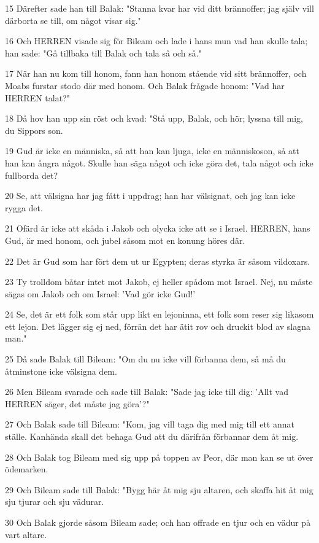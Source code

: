 \par 15 Därefter sade han till Balak: "Stanna kvar har vid ditt brännoffer; jag själv vill därborta se till, om något visar sig."
\par 16 Och HERREN visade sig för Bileam och lade i hans mun vad han skulle tala; han sade: "Gå tillbaka till Balak och tala så och så."
\par 17 När han nu kom till honom, fann han honom stående vid sitt brännoffer, och Moabs furstar stodo där med honom. Och Balak frågade honom: "Vad har HERREN talat?"
\par 18 Då hov han upp sin röst och kvad: "Stå upp, Balak, och hör; lyssna till mig, du Sippors son.
\par 19 Gud är icke en människa, så att han kan ljuga, icke en människoson, så att han kan ångra något. Skulle han säga något och icke göra det, tala något och icke fullborda det?
\par 20 Se, att välsigna har jag fått i uppdrag; han har välsignat, och jag kan icke rygga det.
\par 21 Ofärd är icke att skåda i Jakob och olycka icke att se i Israel. HERREN, hans Gud, är med honom, och jubel såsom mot en konung höres där.
\par 22 Det är Gud som har fört dem ut ur Egypten; deras styrka är såsom vildoxars.
\par 23 Ty trolldom båtar intet mot Jakob, ej heller spådom mot Israel. Nej, nu måste sägas om Jakob och om Israel: 'Vad gör icke Gud!'
\par 24 Se, det är ett folk som står upp likt en lejoninna, ett folk som reser sig likasom ett lejon. Det lägger sig ej ned, förrän det har ätit rov och druckit blod av slagna man."
\par 25 Då sade Balak till Bileam: "Om du nu icke vill förbanna dem, så må du åtminstone icke välsigna dem.
\par 26 Men Bileam svarade och sade till Balak: "Sade jag icke till dig: 'Allt vad HERREN säger, det måste jag göra'?"
\par 27 Och Balak sade till Bileam: "Kom, jag vill taga dig med mig till ett annat ställe. Kanhända skall det behaga Gud att du därifrån förbannar dem åt mig.
\par 28 Och Balak tog Bileam med sig upp på toppen av Peor, där man kan se ut över ödemarken.
\par 29 Och Bileam sade till Balak: "Bygg här åt mig sju altaren, och skaffa hit åt mig sju tjurar och sju vädurar.
\par 30 Och Balak gjorde såsom Bileam sade; och han offrade en tjur och en vädur på vart altare.

